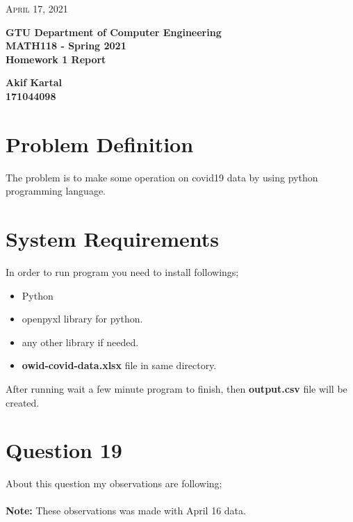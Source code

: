 \documentclass{article}
\begin{document}
\begin{titlepage}

	\begin{flushright}
	\textsc{\large April 17, 2021} \\
	\end{flushright}
	\begin{center}
	\Large{\bfseries GTU Department of Computer Engineering \\ MATH118 - Spring 2021 \\ Homework 1 Report  } \\
	\end{center}
	\vspace*{\fill}
	\begin{center}
	\Large{\bfseries Akif Kartal \\ 171044098 }
	\end{center}
	\vspace*{\fill}

\end{titlepage}

\cleardoublepage
\section{Problem Definition}
The problem is to make some operation on covid19 data by using python programming language.
\section{System Requirements}
In order to run program you need to install followings;
\begin{itemize}
	\item Python
	\item openpyxl library for python.
	\item any other library if needed.
	\item \textbf{owid-covid-data.xlsx} file in same directory.
\end{itemize} 
After running wait a few minute program to finish, then \textbf{output.csv} file will be created.
\section{Question 19}
About this question my observations are following; \\ \\
\textbf{Note:} These observations was made with April 16 data.
\end{document}
